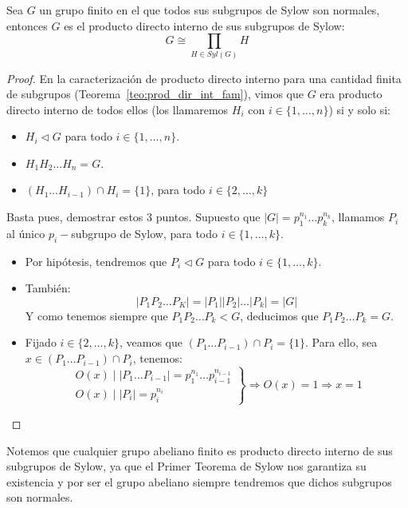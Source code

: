 \begin{teo}\label{teo:prod_grupos_sylow}
    Sea $G$ un grupo finito en el que todos sus subgrupos de Sylow son normales, entonces $G$ es el producto directo interno de sus subgrupos de Sylow:
    \begin{equation*}
        G \cong \prod_{H\in Syl(G)} H
    \end{equation*}
    \begin{proof}
        En la caracterización de producto directo interno para una cantidad finita de subgrupos (Teorema~\ref{teo:prod_dir_int_fam}), vimos que $G$ era producto directo interno de todos ellos (los llamaremos $H_i$ con $i \in \{1,\ldots,n\}$) si y solo si:
        \begin{itemize}
            \item $H_i \lhd G$ para todo $i \in \{1,\ldots,n\}$.
            \item $H_1H_2\ldots H_n = G$.
            \item $(H_1\ldots H_{i-1}) \cap H_i = \{1\}$, para todo $i \in \{2,\ldots,k\}$
        \end{itemize}
        Basta pues, demostrar estos 3 puntos. Supuesto que $|G| = p_1^{n_1} \ldots p_k^{n_k}$, llamamos $P_i$ al único $p_i-$subgrupo de Sylow, para todo $i \in \{1,\ldots,k\}$.

        \begin{itemize}
            \item Por hipótesis, tendremos que $P_i \lhd G$ para todo $i \in \{1,\ldots,k\}$.
            \item También:
                \begin{equation*}
                    |P_1P_2 \ldots P_K| = |P_1||P_2|\ldots |P_k| = |G|
                \end{equation*}
                Y como tenemos siempre que $P_1P_2\ldots P_k < G$, deducimos que $P_1P_2\ldots P_k = G$.
            \item Fijado $i \in \{2,\ldots,k\}$, veamos que $(P_1 \ldots P_{i-1}) \cap P_i = \{1\}$. Para ello, sea $x\in (P_1 \ldots P_{i-1}) \cap P_i$, tenemos:
                \begin{equation*}
                    \left.\begin{array}{l}
                        O(x) \mid |P_1\ldots P_{i-1}| = p_1^{n_1} \ldots p_{i-1}^{n_{i-1}} \\
                        O(x) \mid |P_i| = p_i^{n_i}
                    \end{array}\right\} \Longrightarrow O(x) = 1 \Longrightarrow x = 1
                \end{equation*}\qedhere
        \end{itemize}
    \end{proof}
\end{teo}

\begin{observacion}
    Notemos que cualquier grupo abeliano finito es producto directo interno de sus subgrupos de Sylow, ya que el Primer Teorema de Sylow nos garantiza su existencia y por ser el grupo abeliano siempre tendremos que dichos subgrupos son normales.
\end{observacion}
